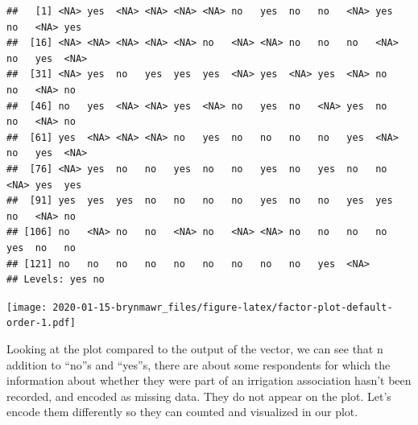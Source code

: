 \documentclass[]{book}
\newenvironment{Shaded}{\begin{snugshade}}{\end{snugshade}}
\newcommand{\KeywordTok}[1]{\textcolor[rgb]{0.13,0.29,0.53}{\textbf{#1}}}
\newcommand{\DataTypeTok}[1]{\textcolor[rgb]{0.13,0.29,0.53}{#1}}
\newcommand{\StringTok}[1]{\textcolor[rgb]{0.31,0.60,0.02}{#1}}
\newcommand{\OperatorTok}[1]{\textcolor[rgb]{0.81,0.36,0.00}{\textbf{#1}}}
\newcommand{\NormalTok}[1]{#1}
\begin{document}
\begin{verbatim}
##   [1] <NA> yes  <NA> <NA> <NA> <NA> no   yes  no   no   <NA> yes  no   <NA> yes 
##  [16] <NA> <NA> <NA> <NA> <NA> no   <NA> <NA> no   no   no   <NA> no   yes  <NA>
##  [31] <NA> yes  no   yes  yes  yes  <NA> yes  <NA> yes  <NA> no   no   <NA> no  
##  [46] no   yes  <NA> <NA> yes  <NA> no   yes  no   <NA> yes  no   no   <NA> no  
##  [61] yes  <NA> <NA> <NA> no   yes  no   no   no   no   yes  <NA> no   yes  <NA>
##  [76] <NA> yes  no   no   yes  no   no   yes  no   yes  no   no   <NA> yes  yes 
##  [91] yes  yes  yes  no   no   no   no   yes  no   no   yes  yes  no   <NA> no  
## [106] no   <NA> no   no   <NA> no   <NA> <NA> no   no   no   no   yes  no   no  
## [121] no   no   no   no   no   no   no   no   no   yes  <NA>
## Levels: yes no
\end{verbatim}

\begin{Shaded}
\end{Shaded}

\texttt{[image: 2020-01-15-brynmawr\_files/figure-latex/factor-plot-default-order-1.pdf]}

Looking at the plot compared to the output of the vector, we can see
that n addition to ``no''s and ``yes''s, there are about some
respondents for which the information about whether they were part of an
irrigation association hasn't been recorded, and encoded as missing
data. They do not appear on the plot. Let's encode them differently so
they can counted and visualized in our plot.

\begin{Shaded}
\end{Shaded}
\end{document}
